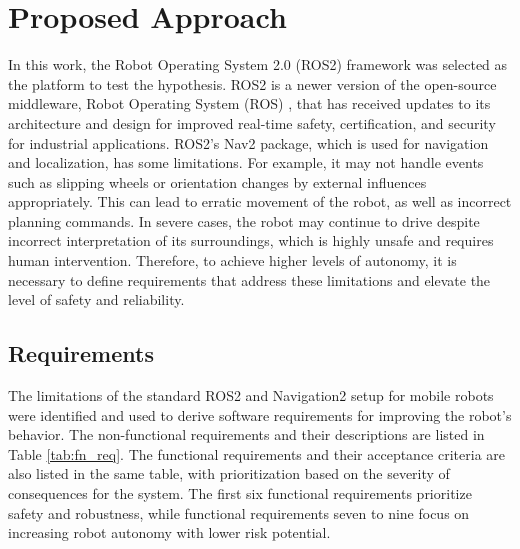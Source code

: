 \documentclass[letterpaper, 10pt, conference]{ieeeconf}
\begin{document}

\section{Proposed Approach}
\label{sec:ProposedApproach}

In this work, the Robot Operating System 2.0 (ROS2) \cite{ros2022} framework was selected as the platform to test the hypothesis. ROS2 is a newer version of the open-source middleware, Robot Operating System (ROS) \cite{quigley2009}, that has received updates to its architecture and design for improved real-time safety, certification, and security for industrial applications. ROS2's Nav2 package, which is used for navigation and localization, has some limitations. For example, it may not handle events such as slipping wheels or orientation changes by external influences appropriately. This can lead to erratic movement of the robot, as well as incorrect planning commands. In severe cases, the robot may continue to drive despite incorrect interpretation of its surroundings, which is highly unsafe and requires human intervention. Therefore, to achieve higher levels of autonomy, it is necessary to define requirements that address these limitations and elevate the level of safety and reliability.

\subsection{Requirements}

The limitations of the standard ROS2 and Navigation2 setup for mobile robots were identified and used to derive software requirements for improving the robot's behavior. The non-functional requirements and their descriptions are listed in Table \ref{tab:fn_req}. The functional requirements and their acceptance criteria are also listed in the same table, with prioritization based on the severity of consequences for the system. The first six functional requirements prioritize safety and robustness, while functional requirements seven to nine focus on increasing robot autonomy with lower risk potential.
\end{document}
